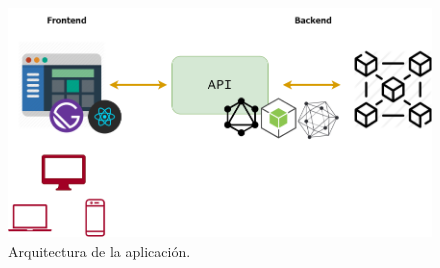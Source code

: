 \begin{figure}[ht!]
  \centering
  \includegraphics[width=\textwidth]{imagenes/desarrollo/arquitectura_aplicacion}
  \caption{Arquitectura de la aplicación.}
  \label{fig:arquitectura-aplicacion}
\end{figure}

\newpage